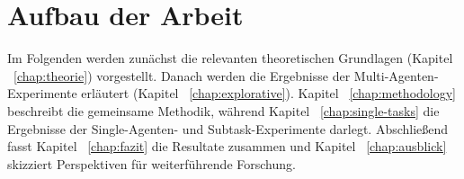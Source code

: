\section{Aufbau der Arbeit}
Im Folgenden werden zunächst die relevanten theoretischen Grundlagen (Kapitel ~\ref{chap:theorie}) vorgestellt. Danach werden die Ergebnisse der Multi-Agenten-Experimente erläutert (Kapitel ~\ref{chap:explorative}). Kapitel ~\ref{chap:methodology} beschreibt die gemeinsame Methodik, während Kapitel ~\ref{chap:single-tasks} die Ergebnisse der Single-Agenten- und Subtask-Experimente darlegt. Abschließend fasst Kapitel ~\ref{chap:fazit} die Resultate zusammen und Kapitel ~\ref{chap:ausblick} skizziert Perspektiven für weiterführende Forschung.